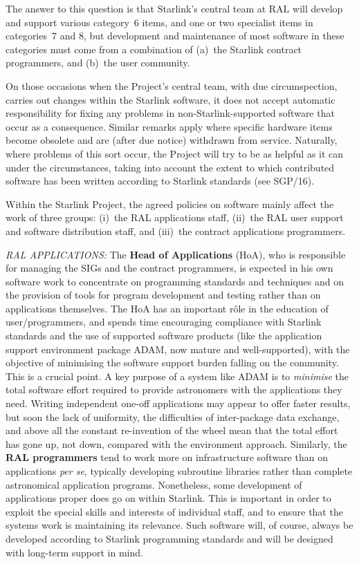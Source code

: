 The answer to this question is that Starlink's central team at RAL will
develop and support various category~6 items, and one or two specialist
items in categories~7 and 8, but development and
maintenance of most software in these categories
must come from a combination of
(a)~the Starlink contract programmers, and (b)~the user community.

On those occasions when the Project's central team,
with due circumspection, carries out
changes within the Starlink software,
it does not accept automatic responsibility
for fixing any problems in non-Starlink-supported
software that occur as a consequence.
Similar remarks apply where specific hardware items
become obsolete and are (after due notice) withdrawn from service.
Naturally, where problems of this sort occur, the Project will try
to be as helpful as it can under the circumstances, taking into
account the extent to which contributed software has been written
according to Starlink standards (see SGP/16).

Within the Starlink Project, the agreed policies on software
mainly affect the work of three groups:
(i)~the RAL applications staff, (ii)~the RAL
user support and software distribution staff, and (iii)~the
contract applications programmers.

{\it RAL APPLICATIONS:} \hspace{2ex} The {\bf Head
of Applications} (HoA), who is responsible for
managing the SIGs and the contract programmers, is expected in
his own software work to concentrate on programming standards
and techniques and on the provision of tools for program
development and testing rather than on applications themselves.
The HoA has an important r\^{o}le in the
education of user/programmers, and spends time encouraging compliance
with Starlink standards and the
use of supported software products (like the application
support environment package ADAM, now mature and
well-supported), with
the objective of minimising the software support
burden falling on the community.  This is a crucial point.
A key purpose of a system like ADAM is to {\it minimise} the
total software effort required to provide astronomers with
the applications they need.  Writing independent
one-off applications may appear to offer faster results, but
soon the lack of uniformity, the difficulties of inter-package
data exchange, and above all the constant re-invention of the
wheel mean that the total effort has gone up, not down, compared
with the environment approach.
Similarly, the {\bf RAL programmers} tend to work more on infrastructure
software than on applications {\it per se}, typically developing
subroutine libraries rather than complete astronomical application
programs.  Nonetheless, some development of applications
proper does go on within Starlink.  This is
important in order to exploit the special skills and interests of
individual staff, and to ensure that the systems work is
maintaining its relevance.  Such software will, of course, always be
developed according to Starlink programming standards and
will be designed with long-term support in mind.

